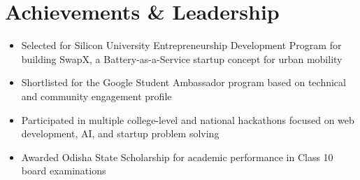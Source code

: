\documentclass[letterpaper,11pt]{article}
\newcommand{\resumeItem}[1]{
  \item\small{
    {#1 \vspace{-2pt}}
  }
}
\newcommand{\resumeItemListStart}{\begin{itemize}}
\newcommand{\resumeItemListEnd}{\end{itemize}\vspace{-5pt}}
\begin{document}
\section{Achievements \& Leadership}
  \resumeItemListStart
    \resumeItem{Selected for Silicon University Entrepreneurship Development Program for building SwapX, a Battery-as-a-Service startup concept for urban mobility}
    \resumeItem{Shortlisted for the Google Student Ambassador program based on technical and community engagement profile}
    \resumeItem{Participated in multiple college-level and national hackathons focused on web development, AI, and startup problem solving}
    \resumeItem{Awarded Odisha State Scholarship for academic performance in Class 10 board examinations}
  \resumeItemListEnd

\end{document}
